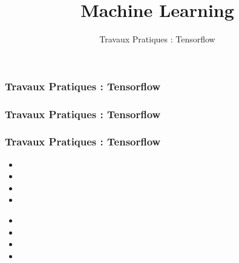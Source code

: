 \documentclass{formation}
\title{Machine Learning}
\subtitle{Travaux Pratiques : Tensorflow }
\begin{document}
\maketitle

\begin{frame}
  \frametitle{Travaux Pratiques : Tensorflow }
\end{frame}

\begin{frame}
  \frametitle{Travaux Pratiques : Tensorflow }
\end{frame}

\begin{frame}
  \frametitle{Travaux Pratiques : Tensorflow }

  
  \begin{itemize}
  \item 
  \item 
  \item 
  \item 
  \end{itemize}

  \begin{minipage}[l]{0.49\linewidth}
  \end{minipage}\hfill
  \begin{minipage}[l]{0.49\linewidth}
  \end{minipage}\hfill

  \begin{minipage}[l]{0.49\linewidth}
      \begin{itemize}
      \item 
      \item 
      \item 
      \item 
      \end{itemize}
  \end{minipage}\hfill
  \begin{minipage}[l]{0.49\linewidth}
  \end{minipage}\hfill

\end{frame}
\end{document}
